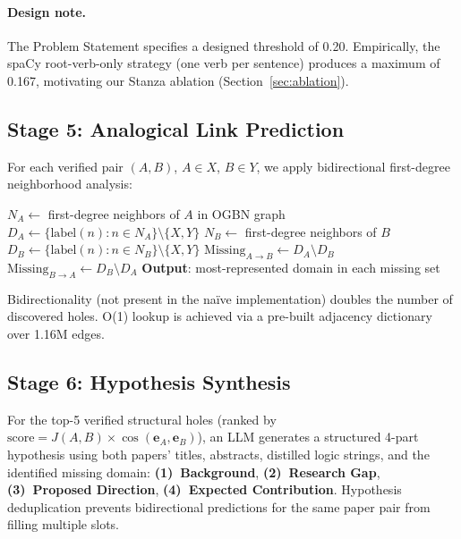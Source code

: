\documentclass[11pt]{article}
\begin{document}
\paragraph{Design note.}
The Problem Statement specifies a designed threshold of 0.20.
Empirically, the spaCy root-verb-only strategy (one verb per sentence) produces
a maximum of 0.167, motivating our Stanza ablation
(Section~\ref{sec:ablation}).

\subsection{Stage 5: Analogical Link Prediction}

For each verified pair $(A, B)$, $A \in X$, $B \in Y$, we apply
bidirectional first-degree neighborhood analysis:

\begin{algorithmic}[1]
\small
\State $N_A \leftarrow$ first-degree neighbors of $A$ in OGBN graph
\State $D_A \leftarrow \{\text{label}(n) : n \in N_A\} \setminus \{X, Y\}$
\State $N_B \leftarrow$ first-degree neighbors of $B$
\State $D_B \leftarrow \{\text{label}(n) : n \in N_B\} \setminus \{X, Y\}$
\State $\text{Missing}_{A\to B} \leftarrow D_A \setminus D_B$ 
\State $\text{Missing}_{B\to A} \leftarrow D_B \setminus D_A$ 
\State \textbf{Output}: most-represented domain in each missing set
\end{algorithmic}

\noindent Bidirectionality (not present in the na\"ive implementation) doubles
the number of discovered holes. O(1) lookup is achieved via a pre-built
adjacency dictionary over 1.16M edges.

\subsection{Stage 6: Hypothesis Synthesis}

For the top-5 verified structural holes (ranked by
$\text{score} = J(A,B) \times \cos(\mathbf{e}_A, \mathbf{e}_B)$),
an LLM generates a structured 4-part hypothesis using both papers' titles,
abstracts, distilled logic strings, and the identified missing domain:
\textbf{(1)~Background}, \textbf{(2)~Research Gap},
\textbf{(3)~Proposed Direction}, \textbf{(4)~Expected Contribution}.
Hypothesis deduplication prevents bidirectional predictions for the same
paper pair from filling multiple slots.

\end{document}
